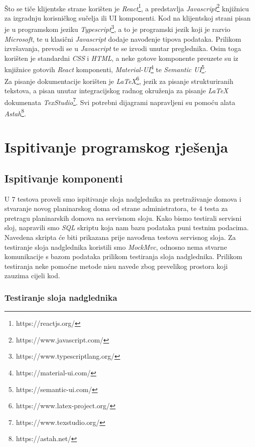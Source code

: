 			  \\Što se tiče klijentske strane korišten je \textit{React}\footnote{https://reactjs.org/}, a predstavlja \textit{Javascript}\footnote{https://www.javascript.com/} knjižnicu za izgradnju korisničkog sučelja ili UI komponenti. Kod na klijentskoj strani pisan je u programskom jeziku \textit{Typescript}\footnote{https://www.typescriptlang.org/}, a to je programski jezik koji je razvio \textit{Microsoft}, te u klasični \textit{Javascript} dodaje navođenje tipova podataka. Prilikom izvršavanja, prevodi se u \textit{Javascript} te se izvodi unutar preglednika. Osim toga korišten je standardni \textit{CSS} i \textit{HTML}, a neke gotove komponente preuzete su iz knjižnice gotovih \textit{React} komponenti, \textit{Material-UI}\footnote{https://material-ui.com/} te \textit{Semantic UI}\footnote{https://semantic-ui.com/}.\\
			  Za pisanje dokumentacije korišten je \textit{LaTeX}\footnote{https://www.latex-project.org/}, jezik za pisanje strukturiranih tekstova, a pisan unutar integracijskog radnog okruženja za pisanje \textit{LaTeX} dokumenata \textit{TexStudio}\footnote{https://www.texstudio.org/}. Svi potrebni dijagrami napravljeni su pomoću alata \textit{Astah}\footnote{https://astah.net/}.
			 		
			\eject 
		
	
		\section{Ispitivanje programskog rješenja}
			
			\subsection{Ispitivanje komponenti}
			U 7 testova proveli smo ispitivanje sloja nadglednika za pretraživanje domova i stvaranje novog planinarskog doma od strane administratora, te 4 testa za pretragu planinarskih domova na servisnom sloju. Kako bismo testirali servisni sloj, napravili smo \textit{SQL} skriptu koja nam bazu podataka puni testnim podacima. Navedena skripta će biti prikazana prije navođena testova servisnog sloja.
			Za testiranje sloja nadglednika koristili smo \textit{MockMvc}, odnosno nema stvarne komunikacije s bazom podataka prilikom testiranja sloja nadglednika. Prilikom testiranja neke pomoćne metode nisu navede zbog prevelikog prostora koji zauzima cijeli kod.\\
			
			\subsubsection{Testiranje sloja nadglednika}
			
